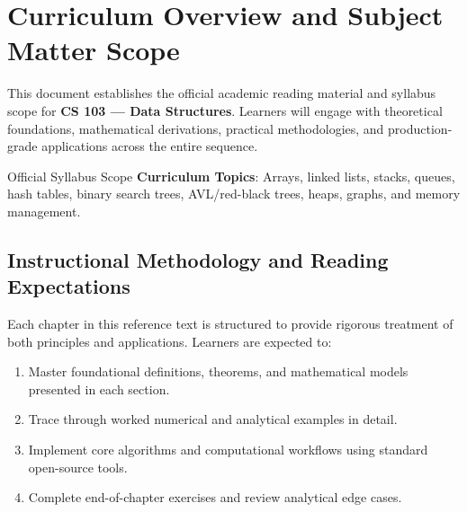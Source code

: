 \section{Curriculum Overview and Subject Matter Scope}

This document establishes the official academic reading material and syllabus scope for \textbf{CS 103 --- Data Structures}. Learners will engage with theoretical foundations, mathematical derivations, practical methodologies, and production-grade applications across the entire sequence.

\begin{InsightBox}{Official Syllabus Scope}
  \textbf{Curriculum Topics}: Arrays, linked lists, stacks, queues, hash tables, binary search trees, AVL/red-black trees, heaps, graphs, and memory management.
\end{InsightBox}

\subsection{Instructional Methodology and Reading Expectations}

Each chapter in this reference text is structured to provide rigorous treatment of both principles and applications. Learners are expected to:
\begin{enumerate}
  \item Master foundational definitions, theorems, and mathematical models presented in each section.
  \item Trace through worked numerical and analytical examples in detail.
  \item Implement core algorithms and computational workflows using standard open-source tools.
  \item Complete end-of-chapter exercises and review analytical edge cases.
\end{enumerate}

